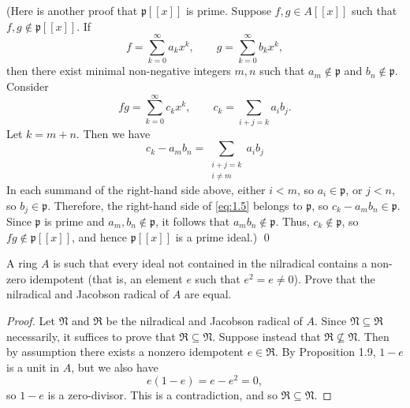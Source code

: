 (Here is another proof that $\mathfrak p[[x]]$ is prime.
Suppose $f,g\in A[[x]]$ such that $f,g\notin\mathfrak p[[x]]$.
If
\begin{equation*}
f = \sum_{k=0}^\infty a_k x^k,
\qquad g = \sum_{k=0}^\infty b_k x^k,
\end{equation*}
then there exist minimal non-negative integers $m,n$ such that $a_m \notin \mathfrak p$ and $b_n \notin \mathfrak p$.
Consider
\begin{equation*}
f g = \sum_{k=0}^\infty c_k x^k,
\qquad
c_k = \sum_{i + j = k} a_i b_j.
\end{equation*}
Let $k = m + n$.
Then we have
\begin{equation}
\label{eq:1.5}
c_k - a_m b_n
= \sum_{\substack{i + j = k \\ i \neq m}} a_i b_j
\end{equation}
In each summand of the right-hand side above, either $i < m$, so $a_i \in \mathfrak p$, or $j < n$, so $b_j \in \mathfrak p$.
Therefore, the right-hand side of \eqref{eq:1.5} belongs to $\mathfrak p$, so $c_k - a_m b_n \in \mathfrak p$.
Since $\mathfrak p$ is prime and $a_m,b_n\notin\mathfrak p$, it follows that $a_m b_n \notin\mathfrak p$.
Thus, $c_k \notin \mathfrak p$, so $f g \notin \mathfrak p[[x]]$, and hence $\mathfrak p[[x]]$ is a prime ideal.)
\qed


\begin{exercise}
\label{ex:1.6}
A ring $A$ is such that every ideal not contained in the nilradical contains a non-zero idempotent (that is, an element $e$ such that $e^2 = e \neq 0$).
Prove that the nilradical and Jacobson radical of $A$ are equal.
\end{exercise}

\begin{proof}
Let $\mathfrak N$ and $\mathfrak R$ be the nilradical and Jacobson radical of $A$.
Since $\mathfrak N \subseteq \mathfrak R$ necessarily, it suffices to prove that $\mathfrak R \subseteq \mathfrak N$.
Suppose instead that $\mathfrak R \not\subseteq \mathfrak N$.
Then by assumption there exists a nonzero idempotent $e \in \mathfrak R$.
By Proposition 1.9, $1-e$ is a unit in $A$, but we also have
\begin{equation*}
e(1-e)=e-e^2 = 0,
\end{equation*}
so $1 - e$ is a zero-divisor.
This is a contradiction, and so $\mathfrak R \subseteq \mathfrak N$.
\end{proof}








